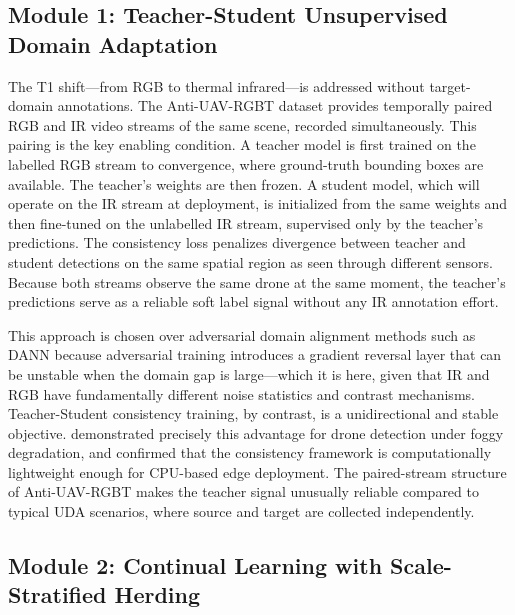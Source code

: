 \documentclass[nolinenumbering]{thesisdesign}
\begin{document}
\subsection{Module 1: Teacher-Student Unsupervised Domain Adaptation}
\label{sec:uda}

The T1 shift---from RGB to thermal infrared---is addressed without target-domain annotations. The Anti-UAV-RGBT dataset \citep{jiang_anti-uav_2023} provides temporally paired RGB and IR video streams of the same scene, recorded simultaneously. This pairing is the key enabling condition. A teacher model is first trained on the labelled RGB stream to convergence, where ground-truth bounding boxes are available. The teacher's weights are then frozen. A student model, which will operate on the IR stream at deployment, is initialized from the same weights and then fine-tuned on the unlabelled IR stream, supervised only by the teacher's predictions. The consistency loss penalizes divergence between teacher and student detections on the same spatial region as seen through different sensors. Because both streams observe the same drone at the same moment, the teacher's predictions serve as a reliable soft label signal without any IR annotation effort.

This approach is chosen over adversarial domain alignment methods such as DANN because adversarial training introduces a gradient reversal layer that can be unstable when the domain gap is large---which it is here, given that IR and RGB have fundamentally different noise statistics and contrast mechanisms. Teacher-Student consistency training, by contrast, is a unidirectional and stable objective. \citet{zheng_foggy_2025} demonstrated precisely this advantage for drone detection under foggy degradation, and \citet{luangluewut_investigating_2025} confirmed that the consistency framework is computationally lightweight enough for CPU-based edge deployment. The paired-stream structure of Anti-UAV-RGBT makes the teacher signal unusually reliable compared to typical UDA scenarios, where source and target are collected independently.


\subsection{Module 2: Continual Learning with Scale-Stratified Herding}
\label{sec:cl}
\end{document}
